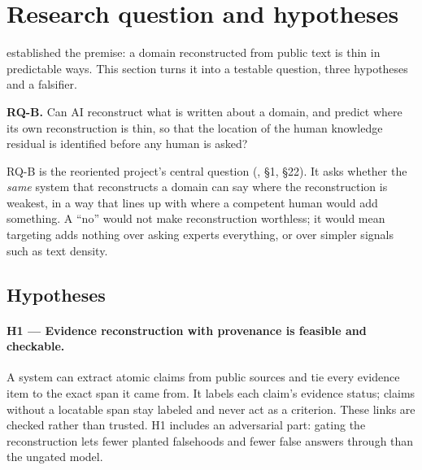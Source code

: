 \section{Research question and hypotheses}
\label{sec:question}

 established the premise: a domain reconstructed from public text is thin in
predictable ways. This section turns it into a testable question, three hypotheses and a falsifier.

\begin{keyquestionbox}
  \textbf{RQ-B.} Can AI reconstruct what is written about a domain, and predict where its own
  reconstruction is thin, so that the location of the human knowledge residual is identified before
  any human is asked?
\end{keyquestionbox}

RQ-B is the reoriented project's central question (, \S1, \S22). It asks
whether the \emph{same} system that reconstructs a domain can say where the reconstruction is
weakest, in a way that lines up with where a competent human would add something. \evint{} A
\enquote{no} would not make reconstruction worthless; it would mean targeting adds nothing over
asking experts everything, or over simpler signals such as text density.

\subsection{Hypotheses}

\paragraph{H1 --- Evidence reconstruction with provenance is feasible and checkable.} A system can
extract atomic claims from public sources and tie every evidence item to the exact span it came
from. It labels each claim's evidence status; claims without a locatable span stay labeled
 and never act as a criterion. These links are checked rather than
trusted. H1 includes an adversarial part: gating the reconstruction lets fewer planted
falsehoods and fewer false answers through than the ungated model.

